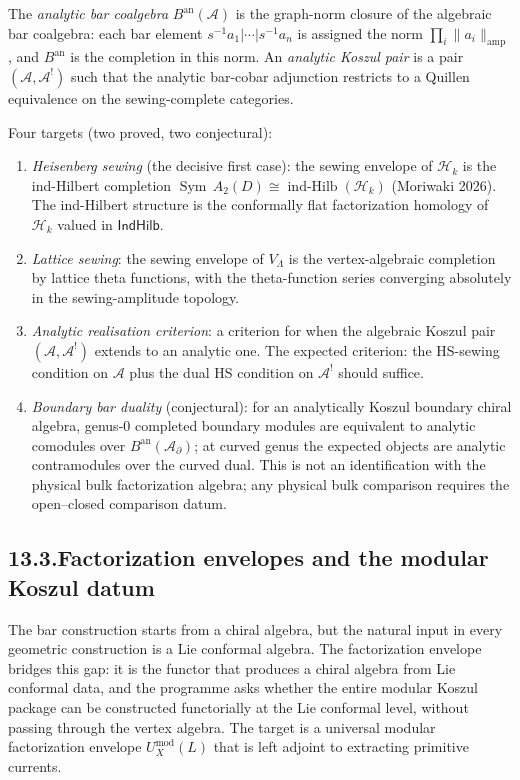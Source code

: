 \documentclass[11pt]{report}
\theoremstyle{definition}
\theoremstyle{remark}
\providecommand{\cA}{\mathcal{A}}
\numberwithin{equation}{section}
\begin{document}
The \emph{analytic bar coalgebra} $B^{\mathrm{an}}(\cA)$ is the
graph-norm closure of the algebraic bar coalgebra: each bar
element $s^{-1}a_1|\cdots|s^{-1}a_n$ is assigned the norm
$\prod_i\|a_i\|_{\mathrm{amp}}$, and $B^{\mathrm{an}}$ is the
completion in this norm. An \emph{analytic Koszul pair} is a pair
$(\cA,\cA^!)$ such that the analytic bar-cobar adjunction restricts
to a Quillen equivalence on the sewing-complete categories.

Four targets (two proved, two conjectural):
\begin{enumerate}[label=(\alph*)]
\item \emph{Heisenberg sewing} (the decisive first case):
 the sewing envelope of $\mathcal H_k$ is the ind-Hilbert
 completion
 $\operatorname{Sym}\,A_2(D)\cong\operatorname{ind-Hilb}(\mathcal H_k)$
 (Moriwaki 2026). The ind-Hilbert structure is the conformally
 flat factorization homology of $\mathcal H_k$ valued in
 $\mathsf{IndHilb}$.
\item \emph{Lattice sewing}: the sewing envelope of $V_\Lambda$
 is the vertex-algebraic completion by lattice theta functions,
 with the theta-function series converging absolutely in the
 sewing-amplitude topology.
\item \emph{Analytic realisation criterion}: a criterion for when
 the algebraic Koszul pair $(\cA,\cA^!)$ extends to an analytic
 one. The expected criterion: the HS-sewing condition on $\cA$
 plus the dual HS condition on $\cA^!$ should suffice.
\item \emph{Boundary bar duality} (conjectural): for an
 analytically Koszul boundary chiral algebra, genus-$0$ completed
 boundary modules are equivalent to analytic comodules over
 $B^{\mathrm{an}}(\cA_\partial)$; at curved genus the expected
 objects are analytic contramodules over the curved dual. This is
 not an identification with the physical bulk factorization algebra;
 any physical bulk comparison requires the open--closed comparison
 datum.
\end{enumerate}

\subsection*{13.3.\enspace Factorization envelopes and the modular Koszul datum}

The bar construction starts from a chiral algebra, but the natural
input in every geometric construction is a Lie conformal algebra.
The factorization envelope bridges this gap: it is the functor that
produces a chiral algebra from Lie conformal data, and the
programme asks whether the entire modular Koszul package can be
constructed functorially at the Lie conformal level, without
passing through the vertex algebra. The target is a
universal modular factorization envelope $U^{\mathrm{mod}}_X(L)$
that is left adjoint to extracting primitive currents.
\end{document}
